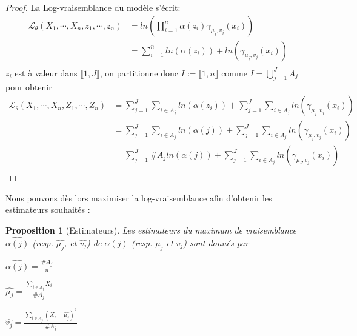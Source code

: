 \documentclass[frenchb]{report}
\newcommand{\1}{\mathbbm{1}}
\newtheorem{prop}{Proposition}
\theoremstyle{definition}\newtheorem{defn}{Définition}
\theoremstyle{definition}\newtheorem{exm}{Exemple}
\theoremstyle{definition}\newtheorem{nota}{Notation}
\theoremstyle{definition}\newtheorem{rem}{Remarque}
\begin{document}
\begin{proof}
La Log-vraisemblance du modèle s'écrit:
\begin{align*}
\mathcal{L}_\theta(X_1, \cdots, X_n, z_1, \cdots, z_n) &= ln\left(\displaystyle\prod_{i=1}^n  \alpha(z_i)\gamma_{\mu_j, v_j}(x_i) \right)\\
&= \displaystyle\sum_{i=1}^n ln(\alpha(z_i))+ ln(\gamma_{\mu_j, v_j}(x_i))\\
\end{align*}
$z_i$ est à valeur dans $\llbracket1,J \rrbracket$, on  partitionne donc $I := \llbracket1,n \rrbracket$ comme $I = \displaystyle\bigcup_{j=1}^J A_j$ pour obtenir
\begin{align*}
\mathcal{L}_\theta(X_1, \cdots, X_n, Z_1, \cdots, Z_n) &=  \displaystyle\sum_{j=1}^J\sum_{i\in A_j} ln(\alpha(z_i))+ \sum_{j=1}^J\sum_{i\in A_j} ln(\gamma_{\mu_j, v_j}(x_i))\\
&= \displaystyle\sum_{j=1}^J\sum_{i\in A_j} ln(\alpha(j))+ \sum_{j=1}^J\sum_{i\in A_j} ln(\gamma_{\mu_j, v_j}(x_i)) \\
&= \displaystyle\sum_{j=1}^J \#A_j ln(\alpha(j))+ \sum_{j=1}^J\sum_{i\in A_j} ln(\gamma_{\mu_j, v_j}(x_i)) \\
\end{align*}
\end{proof}
Nous pouvons dès lors maximiser la log-vraisemblance afin d'obtenir les estimateurs souhaités :
\begin{prop}[Estimateurs]
Les estimateurs du maximum de vraisemblance $\hat{\alpha(j)}$ (resp. $\hat{\mu_j}$, et $\hat{v_j}$) de $\alpha(j)$ (resp. $\mu_j$ et $v_j$) sont donnés par
\begin{center}
$\hat{\alpha(j)} = \frac{\#A_j}{n}$
\end{center}
\begin{center}
$ \hat{\mu_j} = \displaystyle\frac{\sum_{i\in A_j} X_i}{\#A_j} $
\end{center}
\begin{center}
$ \hat{v_j} = \displaystyle \frac{\sum_{i\in A_j}(X_i - \hat{\mu_j})^2}{\#A_j}$
\end{center}
\end{prop}
\end{document}
